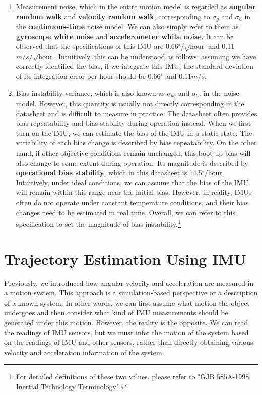 \begin{enumerate}
	\item Measurement noise, which in the entire motion model is regarded as \textbf{angular random walk} and \textbf{velocity random walk}, corresponding to $\sigma_g$ and $\sigma_a$ in the \textbf{continuous-time} noise model. We can also simply refer to them as \textbf{gyroscope white noise} and \textbf{accelerometer white noise}. It can be observed that the specifications of this IMU are 0.66$^\circ/\sqrt{\text{hour}}$ and 0.11$m/s/\sqrt{\text{hour}}$. Intuitively, this can be understood as follows: assuming we have correctly identified the bias, if we integrate this IMU, the standard deviation of its integration error per hour should be 0.66$^\circ$ and $0.11m/s$.
	
	\item Bias instability variance, which is also known as $\sigma_{bg}$ and $\sigma_{ba}$ in the noise model. However, this quantity is usually not directly corresponding in the datasheet and is difficult to measure in practice. The datasheet often provides bias repeatability and bias stability during operation instead. When we first turn on the IMU, we can estimate the bias of the IMU in a static state. The variability of each bias change is described by bias repeatability. On the other hand, if other objective conditions remain unchanged, this boot-up bias will also change to some extent during operation. Its magnitude is described by \textbf{operational bias stability}, which in this datasheet is 14.5$^\circ /\text{hour}$. Intuitively, under ideal conditions, we can assume that the bias of the IMU will remain within this range near the initial bias. However, in reality, IMUs often do not operate under constant temperature conditions, and their bias changes need to be estimated in real time. Overall, we can refer to this specification to set the magnitude of bias instability.\footnote{For detailed definitions of these two values, please refer to "GJB 585A-1998 Inertial Technology Terminology".}
\end{enumerate}


\section{Trajectory Estimation Using IMU}

Previously, we introduced how angular velocity and acceleration are measured in a motion system. This approach is a simulation-based perspective or a description of a known system. In other words, we can first assume what motion the object undergoes and then consider what kind of IMU measurements should be generated under this motion. However, the reality is the opposite. We can read the readings of IMU sensors, but we must infer the motion of the system based on the readings of IMU and other sensors, rather than directly obtaining various velocity and acceleration information of the system.

